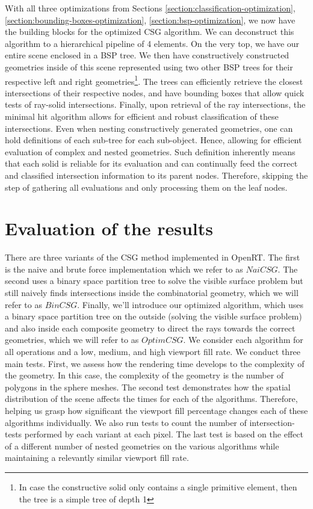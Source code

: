 \documentclass[a4paper,11pt,oneside]{article}
\begin{document}
With all three optimizations from Sections \ref{section:classification-optimization}, \ref{section:bounding-boxes-optimization}, \ref{section:bsp-optimization}, we now have the building blocks for the optimized CSG algorithm. We can deconstruct this algorithm to a hierarchical pipeline of 4 elements. On the very top, we have our entire scene enclosed in a BSP tree. We then have constructively constructed geometries inside of this scene represented using two other BSP trees for their respective left and right geometries\footnote{In case the constructive solid only contains a single primitive element, then the tree is a simple tree of depth 1}. The trees can efficiently retrieve the closest intersections of their respective nodes, and have bounding boxes that allow quick tests of ray-solid intersections. Finally, upon retrieval of the ray intersections, the minimal hit algorithm allows for efficient and robust classification of these intersections. Even when nesting constructively generated geometries, one can hold definitions of each sub-tree for each sub-object. Hence, allowing for efficient evaluation of complex and nested geometries.  Such definition inherently means that each solid is reliable for its evaluation and can continually feed the correct and classified intersection information to its parent nodes. Therefore, skipping the step of gathering all evaluations and only processing them on the leaf nodes.

\section{Evaluation of the results}

There are three variants of the CSG method implemented in OpenRT. The first is the naive and brute force implementation which we refer to as $NaiCSG$. The second uses a binary space partition tree to solve the visible surface problem but still naively finds intersections inside the combinatorial geometry, which we will refer to as $BinCSG$. Finally, we'll introduce our optimized algorithm, which uses a binary space partition tree on the outside (solving the visible surface problem) and also inside each composite geometry to direct the rays towards the correct geometries, which we will refer to as $OptimCSG$. We consider each algorithm for all operations and a low, medium, and high viewport fill rate. We conduct three main tests. First, we assess how the rendering time develops to the complexity of the geometry. In this case, the complexity of the geometry is the number of polygons in the sphere meshes. The second test demonstrates how the spatial distribution of the scene affects the times for each of the algorithms. Therefore, helping us grasp how significant the viewport fill percentage changes each of these algorithms individually. We also run tests to count the number of intersection-tests performed by each variant at each pixel. The last test is based on the effect of a different number of nested geometries on the various algorithms while maintaining a relevantly similar viewport fill rate.
\end{document}
